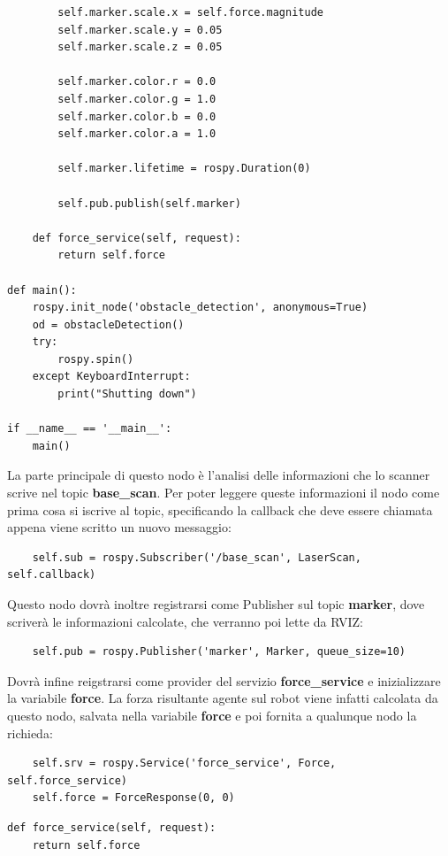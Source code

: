 \documentclass[Lau, binding=0.6cm, oneside]{sapthesis}
\begin{document}
\begin{lstlisting}
        self.marker.scale.x = self.force.magnitude
        self.marker.scale.y = 0.05
        self.marker.scale.z = 0.05

        self.marker.color.r = 0.0
        self.marker.color.g = 1.0
        self.marker.color.b = 0.0
        self.marker.color.a = 1.0

        self.marker.lifetime = rospy.Duration(0)

        self.pub.publish(self.marker)

    def force_service(self, request):
        return self.force

def main():
    rospy.init_node('obstacle_detection', anonymous=True)
    od = obstacleDetection()
    try:
        rospy.spin()
    except KeyboardInterrupt:
        print("Shutting down")

if __name__ == '__main__':
    main()
\end{lstlisting}

La parte principale di questo nodo è l'analisi delle informazioni che lo scanner scrive nel topic \textbf{base\_scan}.
Per poter leggere queste informazioni il nodo come prima cosa si iscrive al topic, specificando la callback che deve essere chiamata appena viene scritto un nuovo messaggio:

\begin{lstlisting}
    self.sub = rospy.Subscriber('/base_scan', LaserScan, self.callback)
\end{lstlisting}

Questo nodo dovrà inoltre registrarsi come Publisher sul topic \textbf{marker}, dove scriverà le informazioni calcolate, che verranno poi lette da RVIZ:

\begin{lstlisting}
    self.pub = rospy.Publisher('marker', Marker, queue_size=10)
\end{lstlisting}

Dovrà infine reigstrarsi come provider del servizio \textbf{force\_service} e inizializzare la variabile \textbf{force}.
La forza risultante agente sul robot viene infatti calcolata da questo nodo, salvata nella variabile \textbf{force} e poi fornita a qualunque nodo la richieda:

\begin{lstlisting}
    self.srv = rospy.Service('force_service', Force, self.force_service)
    self.force = ForceResponse(0, 0)
\end{lstlisting}

\begin{lstlisting}
def force_service(self, request):
    return self.force
\end{lstlisting}
\end{document}
